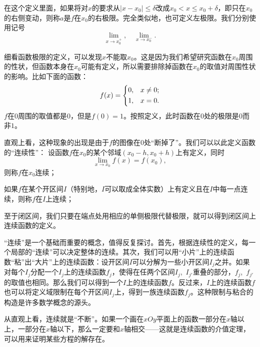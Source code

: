 在这个定义里面，如果将对$x$的要求从$|x-x_0|\leqslant  \delta$改成$x_0<x\leqslant  x_0+\delta$，即只在$x_0$的右侧变动，则称$a$是$f$在$x_0$的右极限。完全类似地，也可定义左极限。我们分别使用记号
\[\lim_{x\to x_0^+},\quad \lim_{x\to x_0^-}.\]

细看函数极限的定义，可以发现$x$不能取$x_0$。这是因为我们希望研究函数在$x_0$周围的性状，但函数本身在$x_0$可能有定义，所以需要排除掉函数在$x_0$的取值对周围性状的影响。比如下面的函数：
\[f(x)=
    \begin{dcases}
        0, & x\neq 0; \\
        1, & x=0.
    \end{dcases}
\]
$f$在$0$周围的取值都是$0$，但是$f(0)=1$。按照定义，此时函数在$0$处的极限是$0$而非$1$。

\begin{center}
\end{center}

直观上看，这种现象的出现是由于$f$的图像在$0$处“断掉了”。我们可以以此定义函数的“连续性”：
设函数$f$在$x_0$的某个邻域$(x_0-h,x_0+h)$上有定义，同时
\[\lim_{x\to x_0}f(x)=f(x_0),\]
则称$f$在$x_0$连续；

如果$f$在某个开区间$I$（特别地，$I$可以取成全体实数）上有定义且在$I$中每一点连续，则称$f$在$I$上连续；

至于闭区间，我们只要在端点处用相应的单侧极限代替极限，就可以得到闭区间上连续函数的定义。

“连续”是一个基础而重要的概念，值得反复探讨。首先，根据连续性的定义，每一个局部的“连续”可以决定整体的连续。其次，我们可以用“小片”上的连续函数“粘”出“大片”上的连续函数：设开区间$I$可以分解为一些小开区间$I_j$之并。如果对每个$I_j$分配一个$I_j$上的连续函数$f_j$，使得在任两个区间$I_j$,~$I_{j'}$重叠的部分，$f_j$,~$f_{j'}$的取值也相同。那么我们可以得到一个$I$上的连续函数$f$。反过来，$I$上的连续函数$f$也可以将定义域限制在每个开区间$I_j$上，得到一族连续函数$f_j$。这种限制与粘合的构造是许多数学概念的源头。

从直观上看，连续就是“不断”。如果一个画在$xOy$平面上的函数一部分在$x$轴以上，一部分在$x$轴以下，那么一定要和$x$轴相交——这就是连续函数的介值定理，可以用来证明某些方程的解存在。

